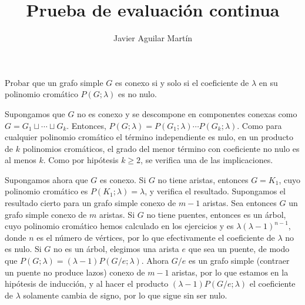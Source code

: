 \documentclass[twoside]{article}
\begin{document}
\title{Prueba de evaluación continua}
\author{Javier Aguilar Martín}
\maketitle


\begin{ejercicio}{1}
Probar que un grafo simple $G$ es conexo si y solo si el coeficiente de $\lambda$ en su polinomio cromático $P(G;\lambda)$ es no nulo. 
\end{ejercicio}
\begin{solucion}
Supongamos que $G$ no es conexo y se descompone en componentes conexas como $G=G_1\sqcup\cdots \sqcup G_k$. Entonces, $P(G;\lambda)=P(G_1;\lambda)\cdots P(G_k;\lambda)$. Como para cualquier polinomio cromático el término independiente es nulo, en un producto de $k$ polinomios cromáticos, el grado del menor término con coeficiente no nulo es al menos $k$. Como por hipótesis $k\geq 2$, se verifica una de las implicaciones. 

Supongamos ahora que $G$ es conexo. Si $G$ no tiene aristas, entonces $G=K_1$, cuyo polinomio cromático es $P(K_1;\lambda)=\lambda$, y verifica el resultado. Supongamos el resultado cierto para un grafo simple conexo de $m-1$ aristas. Sea entonces $G$ un grafo simple conexo de $m$ aristas. Si $G$ no tiene puentes, entonces es un árbol, cuyo polinomio cromático hemos calculado en los ejercicios y es $\lambda(\lambda-1)^{n-1}$, donde $n$ es el número de vértices, por lo que efectivamente el coeficiente de $\lambda$ no es nulo. Si $G$ no es un árbol, elegimos una arista $e$ que sea un puente, de modo que $P(G;\lambda)=(\lambda-1)P(G/e;\lambda)$. Ahora $G/e$ es un grafo simple (contraer un puente no produce lazos) conexo de $m-1$ aristas, por lo que estamos en la hipótesis de inducción, y al hacer el producto $(\lambda-1)P(G/e;\lambda)$ el coeficiente de $\lambda$ solamente cambia de signo, por lo que sigue sin ser nulo.
\end{solucion}
\end{document}
